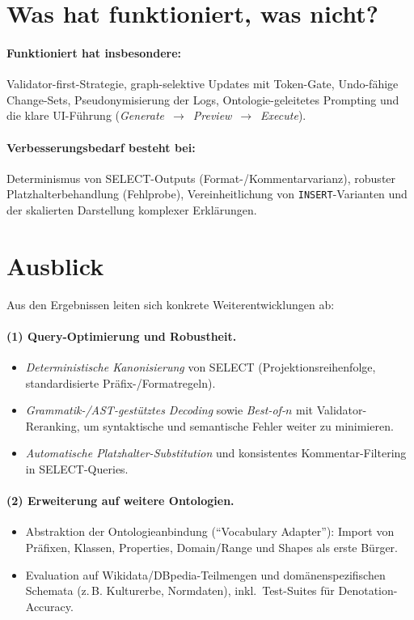 \section*{Was hat funktioniert, was nicht?}
\paragraph{Funktioniert hat insbesondere:}
Validator-first-Strategie, graph-selektive Updates mit Token-Gate, Undo-fähige Change-Sets, Pseudonymisierung der Logs, Ontologie-geleitetes Prompting und die klare UI-Führung (\emph{Generate}~$\rightarrow$~\emph{Preview}~$\rightarrow$~\emph{Execute}).

\paragraph{Verbesserungsbedarf besteht bei:}
Determinismus von SELECT-Outputs (Format-/Kommentarvarianz), robuster Platzhalterbehandlung (Fehlprobe), Vereinheitlichung von \texttt{INSERT}-Varianten und der skalierten Darstellung komplexer Erklärungen.

\section*{Ausblick}
Aus den Ergebnissen leiten sich konkrete Weiterentwicklungen ab:

\paragraph{(1) Query-Optimierung und Robustheit.}
\begin{itemize}
  \item \emph{Deterministische Kanonisierung} von SELECT (Projektionsreihenfolge, standardisierte Präfix-/Formatregeln).
  \item \emph{Grammatik-/AST-gestütztes Decoding} sowie \emph{Best-of-\(n\)} mit Validator-Reranking, um syntaktische und semantische Fehler weiter zu minimieren.
  \item \emph{Automatische Platzhalter-Substitution} und konsistentes Kommentar-Filtering in SELECT-Queries.
\end{itemize}

\paragraph{(2) Erweiterung auf weitere Ontologien.}
\begin{itemize}
  \item Abstraktion der Ontologieanbindung (``Vocabulary Adapter''): Import von Präfixen, Klassen, Properties, Domain/Range und Shapes als erste Bürger.
  \item Evaluation auf Wikidata/DBpedia-Teilmengen und domänenspezifischen Schemata (z.\,B. Kulturerbe, Normdaten), inkl.\ Test-Suites für Denotation-Accuracy.
\end{itemize}

